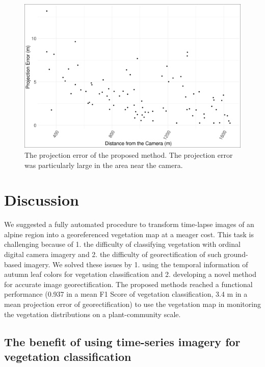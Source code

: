 \documentclass{article}
\begin{document}
\begin{figure}
\includegraphics[width=1\linewidth]{../results/georec_acc} \caption{The projection error of the proposed method. The projection error was particularly large in the area near the camera.}\label{fig:geoacc}
\end{figure}

\hypertarget{discussion}{%
\section{Discussion}\label{discussion}}

We suggested a fully automated procedure to transform time-lapse images of an alpine region into a georeferenced vegetation map at a meager cost. This task is challenging because of 1. the difficulty of classifying vegetation with ordinal digital camera imagery and 2. the difficulty of georectification of such ground-based imagery. We solved these issues by 1. using the temporal information of autumn leaf colors for vegetation classification and 2. developing a novel method for accurate image georectification. The proposed methods reached a functional performance (0.937 in a mean F1 Score of vegetation classification, 3.4 m in a mean projection error of georectification) to use the vegetation map in monitoring the vegetation distributions on a plant-community scale.

\hypertarget{the-benefit-of-using-time-series-imagery-for-vegetation-classification}{%
\subsection{The benefit of using time-series imagery for vegetation classification}\label{the-benefit-of-using-time-series-imagery-for-vegetation-classification}}
\end{document}
